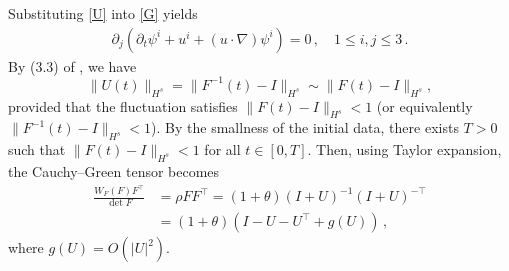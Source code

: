 \documentclass[reqno,11pt]{amsart}
\numberwithin{equation}{section}
\def\p{\partial}
\begin{document}
Substituting \eqref{U} into \eqref{G} yields
\begin{equation}\label{psi}
\begin{aligned}
\p_j(\p_t\psi^i+u^i+(u\cdot \nabla )\psi^i)=0 \,, \quad 1\leq i,j\leq 3\,.
\end{aligned}
\end{equation}
By (3.3) of \cite{Lin-Zhang-CPAM-2008}, we have
$$ \| U(t) \|_{H^s}=\|F^{-1}(t)-I\|_{H^s}\sim\|F(t)-I\|_{H^s},$$
provided that the fluctuation satisfies $\|F(t)-I\|_{H^s} < 1$ (or equivalently $\|F^{-1}(t)-I\|_{H^s} < 1$). By the smallness of the initial data, there exists $T > 0$ such that $\|F(t)-I\|_{H^s} < 1$ for all $t \in [0,T]$. Then, using Taylor expansion, the Cauchy–Green tensor becomes
\begin{equation}\label{CG-tensor}
\begin{aligned}
\frac{ W_F (F) F^\top }{ \det F} & = \rho F F^\top = ( 1 + \theta ) ( I + U)^{-1} ( I + U)^{-\top} \\
& = ( 1 + \theta ) ( I - U - U^\top + g(U) ) \,,
\end{aligned}
\end{equation}
where $g(U)=O(|U|^2).$
\end{document}
